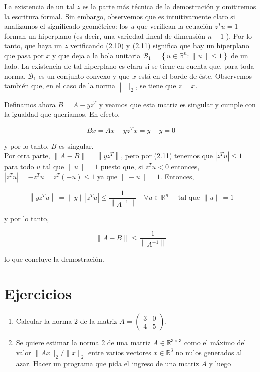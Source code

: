 \documentclass[10pt]{book}
\begin{document}
La existencia de un tal $z$ es la parte más técnica de la demostración y omitiremos la escritura formal. Sin embargo, observemos que es intuitivamente claro si analizamos el significado geométrico: los $u$ que verifican la ecuación $z^{T} u=1$ forman un hiperplano (es decir, una variedad lineal de dimensión $n-1$ ). Por lo tanto, que haya un $z$ verificando (2.10) y (2.11) significa que hay un hiperplano que pasa por $x$ y que deja a la bola unitaria $\mathcal{B}_{1}=\left\{u \in \mathbb{R}^{n}:\|u\| \leq 1\right\}$ de un lado. La existencia de tal hiperplano es clara si se tiene en cuenta que, para toda norma, $\mathcal{B}_{1}$ es un conjunto convexo y que $x$ está en el borde de éste. Observemos también que, en el caso de la norma $\left\|\|_{2}\right.$, se tiene que $z=x$.

Definamos ahora $B=A-y z^{T}$ y veamos que esta matriz es singular y cumple con la igualdad que queríamos. En efecto,

$$
B x=A x-y z^{T} x=y-y=0
$$

y por lo tanto, $B$ es singular.\\
Por otra parte, $\|A-B\|=\left\|y z^{T}\right\|$, pero por (2.11) tenemos que $\left|z^{T} u\right| \leq 1$ para todo $u$ tal que $\|u\|=1$ puesto que, si $z^{T} u<0$ entonces, $\left|z^{T} u\right|=-z^{T} u=z^{T}(-u) \leq 1$ ya que $\|-u\|=1$. Entonces,

$$
\left\|y z^{T} u\right\|=\|y\|\left|z^{T} u\right| \leq \frac{1}{\left\|A^{-1}\right\|} \quad \forall u \in \mathbb{R}^{n} \quad \text { tal que }\|u\|=1
$$

y por lo tanto,

$$
\|A-B\| \leq \frac{1}{\left\|A^{-1}\right\|}
$$

lo que concluye la demostración.

\section{Ejercicios}
\begin{enumerate}
  \item Calcular la norma 2 de la matriz $A=\left(\begin{array}{ll}3 & 0 \\ 4 & 5\end{array}\right)$.
  \item Se quiere estimar la norma 2 de una matriz $A \in \mathbb{R}^{3 \times 3}$ como el máximo del valor $\|A x\|_{2} /\|x\|_{2}$ entre varios vectores $x \in \mathbb{R}^{3}$ no nulos generados al azar. Hacer un programa que pida el ingreso de una matriz $A$ y luego
\end{enumerate}
\end{document}
